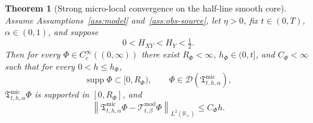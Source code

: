 \documentclass[11pt,a4paper]{amsart}
\theoremstyle{plain}
\newtheorem{theorem}{Theorem}[section]
\theoremstyle{definition}
\theoremstyle{remark}
\newcommand{\R}{\mathbb{R}}
\begin{document}
\begin{theorem}[Strong micro-local convergence on the half-line smooth core]
\label{thm:micro-smooth-core}
Assume Assumptions~\ref{ass:model} and~\ref{ass:obs-source}, let \(\eta>0\), fix
\(t\in(0,T)\), \(\alpha\in(0,1)\), and suppose
\[
0<H_{XY}<H_Y<\tfrac12.
\]
Then for every \(\Phi\in C_c^\infty((0,\infty))\) there exist \(R_\Phi<\infty\),
\(h_\Phi\in(0,t]\), and \(C_\Phi<\infty\) such that for every \(0<h\le h_\Phi\),
\[
\operatorname{supp}\Phi\subset [0,R_\Phi),
\qquad
\Phi\in \mathcal D(\mathfrak T_{t,h,\alpha}^{\mathrm{mic}}),
\]
\(\mathfrak T_{t,h,\alpha}^{\mathrm{mic}}\Phi\) is supported in \([0,R_\Phi]\), and
\begin{equation}\label{eq:micro-smooth-core}
\left\|
\mathfrak T_{t,h,\alpha}^{\mathrm{mic}}\Phi
-\mathcal T_{t,\beta}^{\mathrm{mod}}\Phi
\right\|_{L^2(\R_+)}
\le
C_\Phi h.
\end{equation}
\end{theorem}
\end{document}
